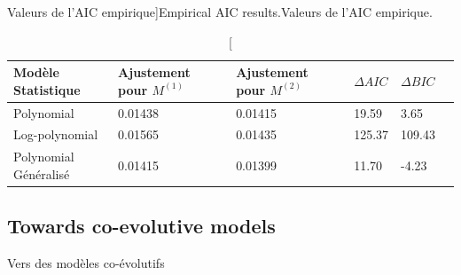 




\begin{table}[ht]
\caption[Empirical AIC values][Valeurs de l'AIC empirique]{Empirical AIC results.}{Valeurs de l'AIC empirique.\label{tab:interactiongibrat:empiricalaic}}
\begin{tabular}{|l|l|l|l|l|l}
\hline
Modèle Statistique & Ajustement pour $M^{(1)}$ & Ajustement pour $M^{(2)}$ & $\Delta AIC$ & $\Delta BIC$\\
\hline
Polynomial & 0.01438 & 0.01415 & 19.59 & 3.65\\
Log-polynomial & 0.01565  & 0.01435 & 125.37 & 109.43\\
Polynomial Généralisé & 0.01415  & 0.01399 & 11.70 & -4.23\\
\hline
\end{tabular}
\end{table}







\subsection{Towards co-evolutive models}{Vers des modèles co-évolutifs}


